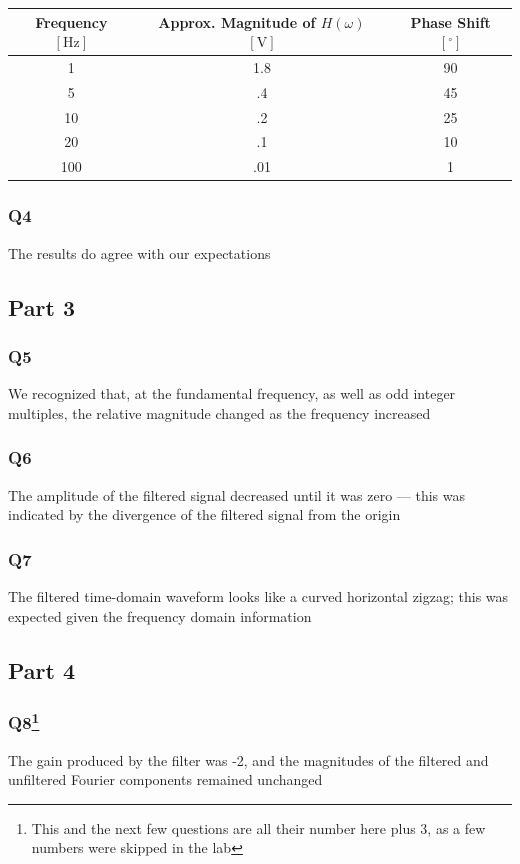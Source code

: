 \documentclass[
	letterpaper, %
	10pt, %
]{CSUniSchoolLabReport}
\begin{document}
\begin{center}
\begin{tabular}[h!]{|c|c|c|}
  \hline
  Frequency $[\si{\hertz}]$ & Approx. Magnitude of $H(\omega)$ $[\si{\volt}]$ & Phase Shift $[^{\circ}]$\\
  \hline
  1 & 1.8 & 90\\
  \hline
  5 & .4 & 45\\
  \hline
  10 & .2 & 25\\
  \hline
  20 & .1 & 10\\
  \hline
  100 & .01 & 1\\
  \hline
\end{tabular}
\end{center}

\subsubsection{Q4} The results do agree with our expectations

\subsection{Part 3}

\subsubsection{Q5} We recognized that, at the fundamental frequency, as well as odd integer multiples, the relative magnitude changed as the frequency increased

\subsubsection{Q6} The amplitude of the filtered signal decreased until it was zero — this was indicated by the divergence of the filtered signal from the origin

\subsubsection{Q7} The filtered time-domain waveform looks like a curved horizontal zigzag; this was expected given the frequency domain information

\subsection{Part 4}

\subsubsection{Q8\footnote{This and the next few questions are all their number here plus 3, as a few numbers were skipped in the lab}} The gain produced by the filter was -2, and the magnitudes of the filtered and unfiltered Fourier components remained unchanged
\end{document}
